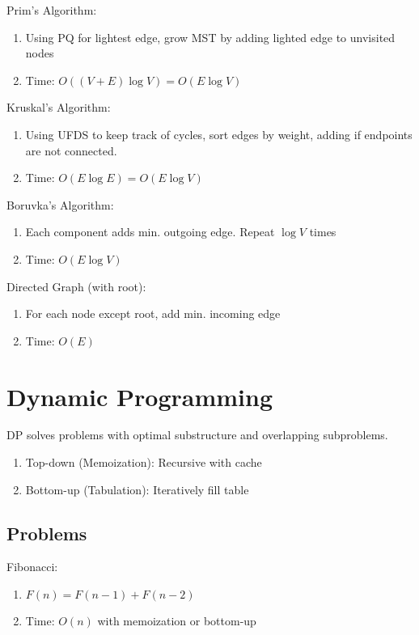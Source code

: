 \documentclass[12pt, a4paper]{article}
\begin{document}
\begin{multicols*}{3}
Prim's Algorithm:
\begin{enumerate}[\roman*.]
  \item Using PQ for lightest edge, grow MST by adding lighted edge to unvisited nodes 
  \item Time: $O((V+E)\log V) = O(E\log V)$
\end{enumerate}

Kruskal's Algorithm:
\begin{enumerate}[\roman*.]
  \item Using UFDS to keep track of cycles, sort edges by weight, adding if endpoints are not connected. 
  \item Time: $O(E\log E) = O(E\log V)$
\end{enumerate}

Boruvka's Algorithm:
\begin{enumerate}[\roman*.]
  \item Each component adds min. outgoing edge. Repeat $\log V$ times
  \item Time: $O(E \log V)$
\end{enumerate}

Directed Graph (with root):
\begin{enumerate}
  \item For each node except root, add min. incoming edge
  \item Time: $O(E)$
\end{enumerate}

\colbreak
\section{Dynamic Programming}

DP solves problems with optimal substructure and overlapping subproblems. 
\begin{enumerate}[\roman*.]
  \item Top-down (Memoization): Recursive with cache
  \item Bottom-up (Tabulation): Iteratively fill table
\end{enumerate}

\subsection*{Problems}

Fibonacci:
\begin{enumerate}[\roman*.]
  \item $F(n) = F(n-1) + F(n-2)$
  \item Time: $O(n)$ with memoization or bottom-up
\end{enumerate}


\end{multicols*}
\end{document}
